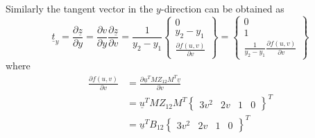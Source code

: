 \documentclass[
10pt, %
a4paper, %
oneside, %
headinclude,footinclude, %
BCOR5mm, %
]{scrartcl}
\begin{document}
Similarly the tangent vector in the $y$-direction can be obtained as
\begin{equation}
\underline{t}_y = \frac{\partial \underline{z}}{\partial y} =  \frac{\partial v}{\partial y} \frac{\partial \underline{z}}{\partial v}  = \frac{1}{y_2 - y_1} \begin{Bmatrix} 0 \\  {y_2 - y_1} \\ \frac{\partial f(u,v)}{\partial v} \end{Bmatrix} = \begin{Bmatrix} 0 \\ 1 \\ \frac{1}{y_2 - y_1} \frac{\partial f(u,v)}{\partial v}\end{Bmatrix}
\end{equation}
where
\begin{equation}
  \begin{split}
    \frac{\partial f(u,v)}{\partial v}
      &= \frac{\partial \underline{u}^T M Z_{12} M^T \underline{v}}{\partial v}\\
      &= \underline{u}^T  M Z_{12} M^T \begin{Bmatrix} 3v^2 & 2v & 1 & 0 \end{Bmatrix}^T\\
      &= \underline{u}^T B_{12} \begin{Bmatrix} 3v^2 & 2v & 1 & 0 \end{Bmatrix}^T
  \end{split}
\end{equation}
\end{document}

